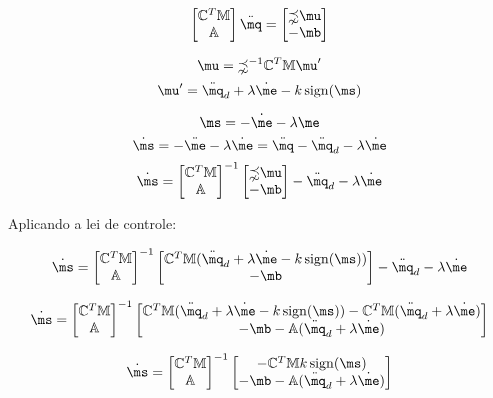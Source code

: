 \newpage

\\

$$
\begin{bmatrix}
\mC^T \mM \\
\mA
\end{bmatrix}
\ddot{\mq}
=
\begin{bmatrix}
\mathbb{\zeta} \mu \\
-\mb
\end{bmatrix}
$$



$$ \mu = \mathbb{\zeta}^{-1} \mC^T \mM \mu' $$
$$ \mu' = \ddot{\mq}_d + \lambda \dot{\me} - k  \sign (\ms) $$

$$ \ms = - \dot{\me} - \lambda \me $$
$$ \dot{\ms} = - \ddot{\me} - \lambda \dot{\me} = \ddot{\mq} - \ddot{\mq}_d  - \lambda \dot{\me} $$
$$ \dot{\ms} =  \begin{bmatrix}
\mC^T \mM \\
\mA
\end{bmatrix}^{-1}
\begin{bmatrix}
\mathbb{\zeta} \mu \\
-\mb
\end{bmatrix}
 - \ddot{\mq}_d  - \lambda \dot{\me} $$
 
Aplicando a lei de controle:

$$ \dot{\ms} =  \begin{bmatrix}
\mC^T \mM \\
\mA
\end{bmatrix}^{-1}
\begin{bmatrix}
 \mC^T \mM (\ddot{\mq}_d + \lambda \dot{\me} - k  \sign (\ms)) \\
-\mb
\end{bmatrix}
 - \ddot{\mq}_d  - \lambda \dot{\me} $$
 
 $$ \dot{\ms} =  \begin{bmatrix}
\mC^T \mM \\
\mA
\end{bmatrix}^{-1}
\begin{bmatrix}
 \mC^T \mM (\ddot{\mq}_d + \lambda \dot{\me} - k  \sign (\ms)) -  \mC^T \mM(\ddot{\mq}_d  + \lambda \dot{\me}) \\
-\mb - \mA(\ddot{\mq}_d  + \lambda \dot{\me})
\end{bmatrix} $$

 $$ \dot{\ms} =  \begin{bmatrix}
\mC^T \mM \\
\mA
\end{bmatrix}^{-1}
\begin{bmatrix}
- \mC^T \mM  k  \sign (\ms) \\
-\mb - \mA(\ddot{\mq}_d  + \lambda \dot{\me})
\end{bmatrix} $$

